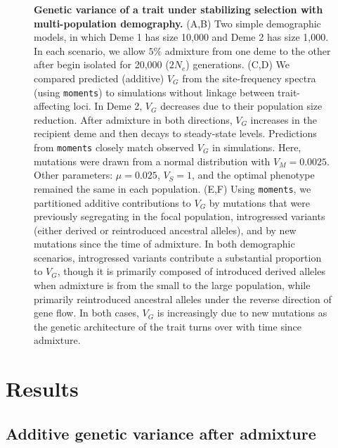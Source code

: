 \documentclass[10pt,letterpaper]{article}
\newcommand{\moments}{\texttt{moments}\xspace}
\begin{document}
\begin{figure}[tb!]
    \centering
    \caption{
        \textbf{Genetic variance of a trait under stabilizing selection with
        multi-population demography.}
        (A,B) Two simple demographic models, in which Deme 1 has size 10,000
        and Deme 2 has size 1,000. In each scenario, we allow $5\%$ admixture
        from one deme to the other after begin isolated for 20,000 ($2N_e$)
        generations.
        (C,D) We compared predicted (additive) $V_G$ from the site-frequency
        spectra (using \moments) to simulations
        without linkage between trait-affecting loci. In Deme 2, $V_G$ decreases
        due to their population size reduction. After admixture in both
        directions, $V_G$ increases in the recipient deme
        and then decays to steady-state levels. Predictions from \moments closely
        match observed $V_G$ in simulations.
        Here, mutations were drawn from a normal distribution with $V_M=0.0025$.
        Other parameters: $\mu=0.025$, $V_S=1$, and the optimal phenotype remained
        the same in each population.
        (E,F) Using \moments, we partitioned additive contributions to $V_G$ by
        mutations that were previously segregating in the focal population,
        introgressed variants (either derived or reintroduced ancestral alleles),
        and by new mutations since the time of admixture. In both demographic
        scenarios, introgressed variants contribute a substantial proportion to
        $V_G$, though it is primarily composed of introduced derived alleles when
        admixture is from the small to the large population, while primarily
        reintroduced ancestral alleles under the reverse direction of gene flow.
        In both cases, $V_G$ is increasingly due to new mutations as the genetic
        architecture of the trait turns over with time since admixture.
    }
    \label{fig:toy-admixture}
\end{figure}

\section*{Results}


\subsection*{Additive genetic variance after admixture}
\end{document}
